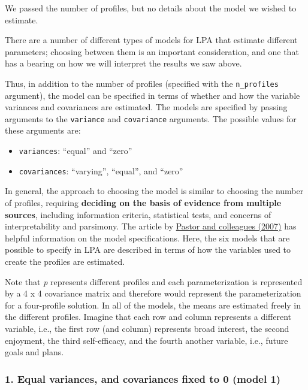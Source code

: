 \documentclass[man]{apa6}
\providecommand{\tightlist}{%
  \setlength{\itemsep}{0pt}\setlength{\parskip}{0pt}}
\begin{document}
We passed the number of profiles, but no details about the model we wished to estimate.

There are a number of different types of models for LPA that estimate different parameters; choosing
between them is an important consideration, and one that has a bearing on how we will interpret the results we saw above.

Thus, in addition to the number of profiles (specified with the \texttt{n\_profiles}
argument), the model can be specified in terms of whether and how the variable
variances and covariances are estimated. The models are specified by passing arguments to the \texttt{variance} and \texttt{covariance}
arguments. The possible values for these arguments are:

\begin{itemize}
\tightlist
\item
  \texttt{variances}: \enquote{equal} and \enquote{zero}
\item
  \texttt{covariances}: \enquote{varying}, \enquote{equal}, and \enquote{zero}
\end{itemize}

In general, the approach to choosing the model is similar to choosing the number of profiles, requiring \textbf{deciding on the basis of evidence from multiple sources}, including information criteria, statistical tests, and concerns of interpretability and parsimony. The article by \href{https://www.sciencedirect.com/science/article/pii/S0361476X06000543}{Pastor and colleagues (2007)} has helpful information on the model specifications. Here, the six models that are possible to specify in LPA are described in terms of how the variables used to create the profiles are estimated.

Note that \emph{p} represents different profiles and each parameterization is represented by a 4 x 4 covariance matrix and therefore would represent the parameterization for a four-profile solution. In all of the models, the means are estimated freely in the different profiles. Imagine that each row and column represents a different variable, i.e., the first row (and column) represents broad interest, the second enjoyment, the third self-efficacy, and the fourth another variable, i.e., future goals and plans.

\hypertarget{equal-variances-and-covariances-fixed-to-0-model-1}{%
\subsubsection{1. Equal variances, and covariances fixed to 0 (model 1)}\label{equal-variances-and-covariances-fixed-to-0-model-1}}
\end{document}
